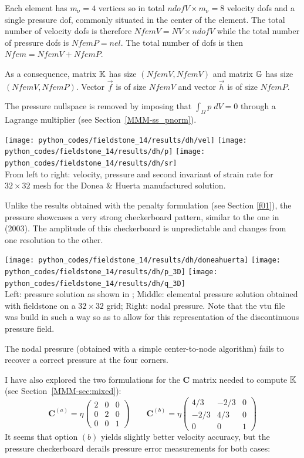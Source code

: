 Each element has $m_\upnu=4$ vertices so in total $ndofV\times m_\upnu=8$ 
velocity dofs and a single 
pressure dof, commonly situated in the center of the element. The total number of 
velocity dofs is therefore $NfemV=NV \times ndofV$ while the total number of
pressure dofs is $NfemP=nel$. The total number of dofs is then $Nfem=NfemV+NfemP$.

As a consequence, matrix ${\mathbb{K}}$ has size $(NfemV,NfemV)$ and matrix ${\mathbb{G}}$ has size $(NfemV,NfemP)$.
Vector $\vec{f}$ is of size $NfemV$ and vector $\vec{h}$ is of size $NfemP$.  

The pressure nullspace is removed by imposing that $\int_\Omega p \; dV =0$ through 
a Lagrange multiplier (see Section~\ref{MMM-ss_pnorm}).

\begin{center}
\texttt{[image: python\_codes/fieldstone\_14/results/dh/vel]}
\texttt{[image: python\_codes/fieldstone\_14/results/dh/p]}
\texttt{[image: python\_codes/fieldstone\_14/results/dh/sr]}\\
{\captionfont From left to right: velocity, pressure and second invariant 
of strain rate for $32\times 32$ mesh for the Donea \& Huerta manufactured solution.}
\end{center}

Unlike the results obtained with the penalty formulation (see Section \ref{f01}),
the pressure showcases a very strong checkerboard pattern, similar to the one 
in \textcite{dohu03} (2003). The amplitude of this checkerboard is unpredictable 
and changes from one resolution to the other.

\begin{center}
\texttt{[image: python\_codes/fieldstone\_14/results/dh/doneahuerta]}
\texttt{[image: python\_codes/fieldstone\_14/results/dh/p\_3D]}
\texttt{[image: python\_codes/fieldstone\_14/results/dh/q\_3D]}\\
{\captionfont Left: pressure solution as shown in \cite{dohu03}; Middle: elemental 
pressure solution obtained with fieldstone on a $32\times 32$ grid; 
Right: nodal pressure. 
Note that the vtu file was build in such a way so as to allow for 
this representation of the discontinuous pressure field.}
\end{center}

The nodal pressure (obtained with a simple center-to-node algorithm)
fails to recover a correct pressure at the four corners.

I have also explored the two formulations for the ${\bm C}$ matrix needed to 
compute ${\mathbb{K}}$ (see Section~\ref{MMM-sec:mixed}):
\[
{\bm C}^{(a)}= \eta 
\left(
\begin{array}{ccc}
2 & 0 & 0 \\
0 & 2 & 0 \\
0 & 0 & 1
\end{array}
\right)
\qquad
{\bm C}^{(b)}= \eta
\left(
\begin{array}{ccc}
4/3 & -2/3 & 0 \\
-2/3 & 4/3 & 0 \\
0 & 0 & 1
\end{array}
\right)
\]
It seems that option $(b)$ yields slightly better velocity accuracy, but the pressure 
checkerboard derails pressure error measurements for both cases:

